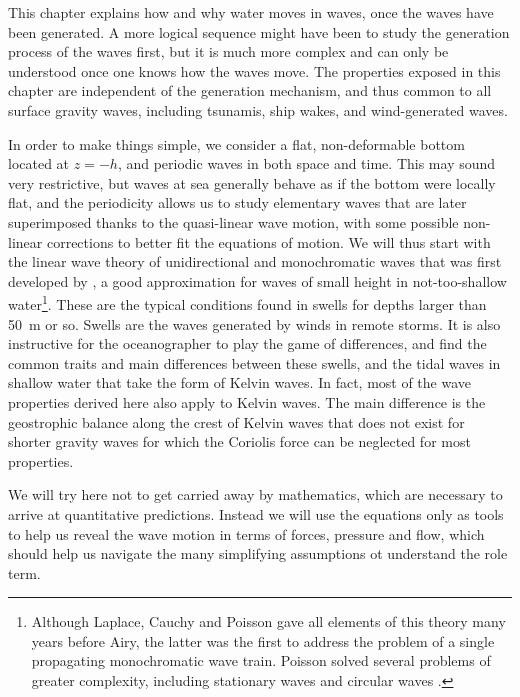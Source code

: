 This chapter explains how and why water moves in waves, once the waves have been generated. 
A more logical sequence might have been to study the generation process of the waves first, but it is much more complex 
and can only be understood once one knows how the waves move. The properties exposed in this chapter
are independent of the generation mechanism, and thus common to all surface gravity waves, including tsunamis, ship wakes, and wind-generated waves. 

In order to make things simple, we consider a flat, non-deformable bottom 
located at $z=-h$, and periodic waves in both space and time. This may sound very restrictive, but waves at 
sea generally behave as if the bottom were locally flat, and the periodicity allows us to study elementary waves 
that are later superimposed thanks to the quasi-linear wave motion, with some possible non-linear corrections to better fit
the equations of motion. We will thus start with the linear wave theory of unidirectional and monochromatic 
waves that was first developed by  \cite{Airy1841}, a good approximation for waves of small height in not-too-shallow water\footnote{Although 
Laplace, Cauchy and Poisson gave all elements of this theory many years 
before Airy, the latter was the first to address the problem of a single propagating monochromatic 
wave train. Poisson solved several problems of greater complexity, including stationary waves 
and circular waves \citep{Craik2004}.}.
These are the typical conditions found in swells for depths larger than 50~m or so. Swells are the waves generated by winds in remote storms. 
It is also instructive for the oceanographer to play the game of differences, and find the common traits and main differences 
between these swells, and the tidal waves in shallow water that take the form of  Kelvin waves. In fact, most 
of the wave properties derived here also apply to Kelvin waves. The main difference is the geostrophic balance along the crest of Kelvin waves 
that does not exist for shorter gravity waves for which the Coriolis force can be neglected for most properties. 


We will try here not to get carried away by mathematics, which are necessary to arrive at quantitative predictions.
Instead we will use the equations only as tools to help us reveal the wave motion in terms of forces, pressure and flow, which should 
help us navigate the many simplifying assumptions ot understand the role term. 

